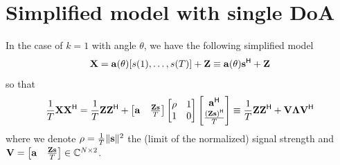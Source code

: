 \documentclass[11pt,a4paper]{article}
\begin{document}


\section{Simplified model with single DoA}

In the case of $k=1$ with angle $\theta$, we have the following simplified model
\begin{equation}
	{\mathbf{X}} = \mathbf{a}(\theta) [s(1), \ldots, s(T)] + {\mathbf{Z}} \equiv \mathbf{a}(\theta) \mathbf{s}^{\sf H} + {\mathbf{Z}}
\end{equation}
so that 
\begin{equation}
	\frac1T {\mathbf{X}} {\mathbf{X}}^{\sf H} = \frac1T {\mathbf{Z}} {\mathbf{Z}}^{\sf H} + \begin{bmatrix}\mathbf{a} & \frac{{\mathbf{Z}} \mathbf{s}}{T}\end{bmatrix} \begin{bmatrix} \rho & 1 \\ 1 & 0 \end{bmatrix} \begin{bmatrix}\mathbf{a}^{\sf H} \\ \frac{({\mathbf{Z}} \mathbf{s})^{\sf H}}{T}\end{bmatrix} \equiv \frac1T {\mathbf{Z}} {\mathbf{Z}}^{\sf H} + \mathbf{V} \boldsymbol{\Lambda} \mathbf{V}^{\sf H}
\end{equation}
where we denote $\rho = \frac1T \| \mathbf{s} \|^2 $ the (limit of the normalized) signal strength and $\mathbf{V} = \begin{bmatrix}\mathbf{a} & \frac{{\mathbf{Z}} \mathbf{s}}{T}\end{bmatrix} \in {\mathbb{C}}^{N \times 2}$.
\end{document}
